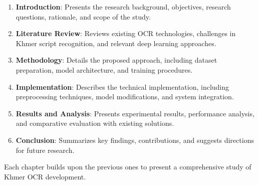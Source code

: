 \begin{enumerate}
    \item \textbf{Introduction}: Presents the research background, objectives, research questions, rationale, and scope of the study.
    
    \item \textbf{Literature Review}: Reviews existing OCR technologies, challenges in Khmer script recognition, and relevant deep learning approaches.
    
    \item \textbf{Methodology}: Details the proposed approach, including dataset preparation, model architecture, and training procedures.
    
    \item \textbf{Implementation}: Describes the technical implementation, including preprocessing techniques, model modifications, and system integration.
    
    \item \textbf{Results and Analysis}: Presents experimental results, performance analysis, and comparative evaluation with existing solutions.
    
    \item \textbf{Conclusion}: Summarizes key findings, contributions, and suggests directions for future research.
\end{enumerate}
Each chapter builds upon the previous ones to present a comprehensive study of Khmer OCR development.
